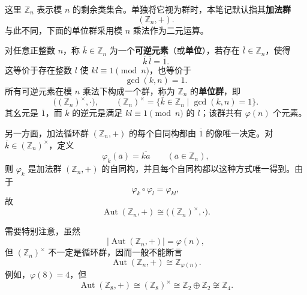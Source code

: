 \begin{purplenote}
这里 $\mathbb Z_n$ 表示模 $n$ 的剩余类集合。单独将它视为群时，本笔记默认指其\textbf{加法群}
\[
  (\mathbb Z_n,+).
\]
与此不同，下面的单位群采用模 $n$ 乘法作为二元运算。

对任意正整数 $n$，称 $\overline k\in\mathbb Z_n$ 为一个\textbf{可逆元素}（或\textbf{单位}），若存在 $\overline l\in\mathbb Z_n$，使得
\[
  \overline k\,\overline l=\overline 1.
\]
这等价于存在整数 $l$ 使 $kl\equiv1\pmod n$，也等价于
\[
  \gcd(k,n)=1.
\]
所有可逆元素在模 $n$ 乘法下构成一个群，称为 $\mathbb Z_n$ 的\textbf{单位群}，即
\[
  \bigl((\mathbb Z_n)^{\times},\cdot\bigr),
  \qquad
  (\mathbb Z_n)^{\times}
  =\{\overline k\in\mathbb Z_n\mid \gcd(k,n)=1\}.
\]
其幺元是 $\overline1$，而 $\overline k$ 的逆元是满足 $kl\equiv1\pmod n$ 的 $\overline l$；该群共有 $\varphi(n)$ 个元素。

另一方面，加法循环群 $(\mathbb Z_n,+)$ 的每个自同构都由 $\overline1$ 的像唯一决定。对 $\overline k\in(\mathbb Z_n)^{\times}$，定义
\[
  \varphi_k(\overline a)=\overline{ka}\qquad(\overline a\in\mathbb Z_n),
\]
则 $\varphi_k$ 是加法群 $(\mathbb Z_n,+)$ 的自同构，并且每个自同构都以这种方式唯一得到。由于
\[
  \varphi_k\circ\varphi_l=\varphi_{kl},
\]
故
\[
  \operatorname{Aut}(\mathbb Z_n,+)
  \cong\bigl((\mathbb Z_n)^{\times},\cdot\bigr).
\]

需要特别注意，虽然
\[
  \bigl|\operatorname{Aut}(\mathbb Z_n,+)\bigr|=\varphi(n),
\]
但 $(\mathbb Z_n)^{\times}$ 不一定是循环群，因而一般不能断言
\[
  \operatorname{Aut}(\mathbb Z_n,+)\cong\mathbb Z_{\varphi(n)}.
\]
例如，$\varphi(8)=4$，但
\[
  \operatorname{Aut}(\mathbb Z_8,+)
  \cong(\mathbb Z_8)^{\times}
  \cong\mathbb Z_2\oplus\mathbb Z_2
  \not\cong\mathbb Z_4.
\]
\end{purplenote}
